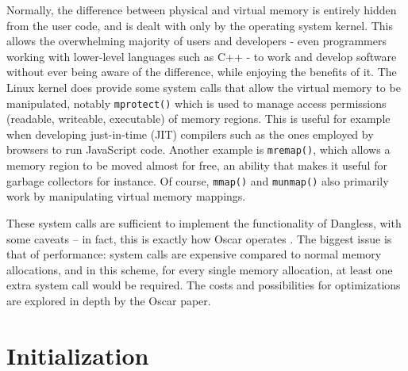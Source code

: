 Normally, the difference between physical and virtual memory is entirely hidden from the user code, and is dealt with only by the operating system kernel. This allows the overwhelming majority of users and developers - even programmers working with lower-level languages such as C++ - to work and develop software without ever being aware of the difference, while enjoying the benefits of it. The Linux kernel does provide some system calls that allow the virtual memory to be manipulated, notably \lstinline!mprotect()! which is used to manage access permissions (readable, writeable, executable) of memory regions. This is useful for example when developing just-in-time (JIT) compilers such as the ones employed by browsers to run JavaScript code. Another example is \lstinline!mremap()!, which allows a memory region to be moved almost for free, an ability that makes it useful for garbage collectors for instance. Of course,  \lstinline!mmap()! and \lstinline!munmap()! also primarily work by manipulating virtual memory mappings.

These system calls are sufficient to implement the functionality of Dangless, with some caveats -- in fact, this is exactly how Oscar operates . The biggest issue is that of performance: system calls are expensive compared to normal memory allocations, and in this scheme, for every single memory allocation, at least one extra system call would be required. The costs and possibilities for optimizations are explored in depth by the Oscar paper.


\section{Initialization}
\label{sec:dangless-init}

